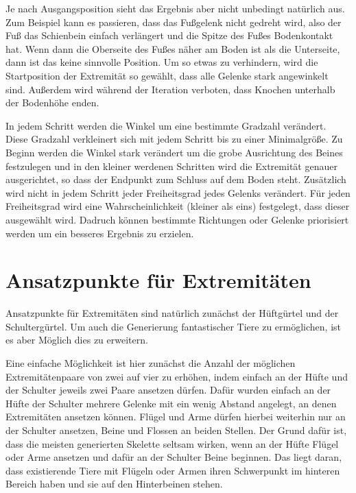 Je nach Ausgangsposition sieht das Ergebnis aber nicht unbedingt natürlich aus. Zum Beispiel kann es passieren, dass das Fußgelenk nicht gedreht wird, also der Fuß das Schienbein einfach verlängert und die Spitze des Fußes Bodenkontakt hat. Wenn dann die Oberseite des Fußes näher am Boden ist als die Unterseite, dann ist das keine sinnvolle Position.
Um so etwas zu verhindern, wird die Startposition der Extremität so gewählt, dass alle Gelenke stark angewinkelt sind. 
Außerdem wird während der Iteration verboten, dass Knochen unterhalb der Bodenhöhe enden.

In jedem Schritt werden die Winkel um eine bestimmte Gradzahl verändert. Diese Gradzahl verkleinert sich mit jedem Schritt bis zu einer Minimalgröße. Zu Beginn werden die Winkel stark verändert um die grobe Ausrichtung des Beines festzulegen und in den kleiner werdenen Schritten wird die Extremität genauer ausgerichtet, so dass der Endpunkt zum Schluss auf dem Boden steht.
Zusätzlich wird nicht in jedem Schritt jeder Freiheitsgrad jedes Gelenks verändert. Für jeden Freiheitsgrad wird eine Wahrscheinlichkeit (kleiner als eins) festgelegt, dass dieser ausgewählt wird. Dadruch können bestimmte Richtungen oder Gelenke priorisiert werden um ein besseres Ergebnis zu erzielen. 

\section{Ansatzpunkte für Extremitäten}

Ansatzpunkte für Extremitäten sind natürlich zunächst der Hüftgürtel und der Schultergürtel. Um auch die Generierung fantastischer Tiere zu ermöglichen, ist es aber Möglich dies zu erweitern.

Eine einfache Möglichkeit ist hier zunächst die Anzahl der möglichen Extremitätenpaare von zwei auf vier zu erhöhen, indem einfach an der Hüfte und der Schulter jeweils zwei Paare ansetzen dürfen. Dafür wurden einfach an der Hüfte \bzw der Schulter mehrere Gelenke mit ein wenig Abstand angelegt, an denen Extremitäten ansetzen können.
Flügel und Arme dürfen hierbei weiterhin nur an der Schulter ansetzen, Beine und Flossen an beiden Stellen. Der Grund dafür ist, dass die meisten generierten Skelette seltsam wirken, wenn an der Hüfte Flügel oder Arme ansetzen und dafür an der Schulter Beine beginnen. Das liegt daran, dass existierende Tiere mit Flügeln oder Armen ihren Schwerpunkt im hinteren Bereich haben und sie auf den Hinterbeinen stehen.

